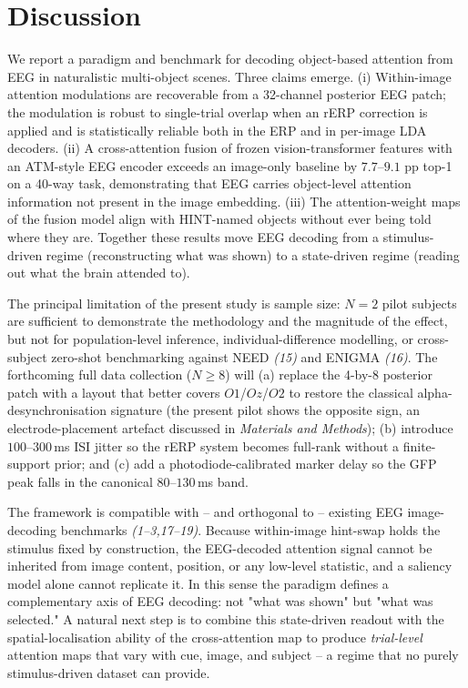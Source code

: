 \documentclass[12pt]{article}
\begin{document}
\section*{Discussion}

We report a paradigm and benchmark for decoding object-based
attention from EEG in naturalistic multi-object scenes.  Three
claims emerge.  (i) Within-image attention modulations are
recoverable from a 32-channel posterior EEG patch; the modulation
is robust to single-trial overlap when an rERP correction is
applied and is statistically reliable both in the ERP and in
per-image LDA decoders.  (ii) A cross-attention fusion of frozen
vision-transformer features with an ATM-style EEG encoder
exceeds an image-only baseline by $7.7$--$9.1$ pp top-1 on a
40-way task, demonstrating that EEG carries object-level attention
information not present in the image embedding.  (iii) The
attention-weight maps of the fusion model align with HINT-named
objects without ever being told where they are.  Together these
results move EEG decoding from a stimulus-driven regime
(reconstructing what was shown) to a state-driven regime
(reading out what the brain attended to).

The principal limitation of the present study is sample size:
$N=2$ pilot subjects are sufficient to demonstrate the methodology
and the magnitude of the effect, but not for population-level
inference, individual-difference modelling, or cross-subject
zero-shot benchmarking against NEED \textit{(15)} and ENIGMA
\textit{(16)}.  The forthcoming full data collection ($N\geq8$)
will (a) replace the 4-by-8 posterior patch with a layout that
better covers $O1$/$Oz$/$O2$ to restore the classical
alpha-desynchronisation signature (the present pilot shows the
opposite sign, an electrode-placement artefact discussed in
\textit{Materials and Methods}); (b) introduce $100$--$300$\,ms ISI
jitter so the rERP system becomes full-rank without a finite-support
prior; and (c) add a photodiode-calibrated marker delay so the GFP
peak falls in the canonical $80$--$130$\,ms band.

The framework is compatible with -- and orthogonal to -- existing
EEG image-decoding benchmarks \textit{(1--3,17--19)}.  Because
within-image hint-swap holds the stimulus fixed by construction,
the EEG-decoded attention signal cannot be inherited from image
content, position, or any low-level statistic, and a saliency
model alone cannot replicate it.  In this sense the paradigm
defines a complementary axis of EEG decoding: not "what was
shown" but "what was selected."  A natural next step is to
combine this state-driven readout with the spatial-localisation
ability of the cross-attention map to produce
\textit{trial-level} attention maps that vary with cue, image, and
subject -- a regime that no purely stimulus-driven dataset can
provide.
\end{document}

